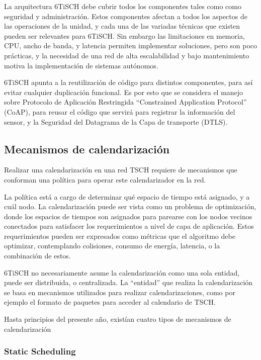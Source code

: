 La arquitectura 6TiSCH debe cubrir todos los componentes tales como como seguridad y administración. Estos componentes afectan a todos los aspectos de las operaciones de la unidad, y cada una de las variadas técnicas que existen pueden ser relevantes para 6TiSCH. Sin embargo las limitaciones en memoria, CPU, ancho de banda, y latencia permiten implementar soluciones, pero son poco prácticas, y la necesidad de una red de alta escalabilidad y bajo mantenimiento motiva la implementación de sistemas autónomos.

6TiSCH apunta a la reutilización de código para distintos componentes, para así evitar cualquier duplicación funcional. Es por esto que se considera el manejo sobre Protocolo de Aplicación Restringida ``Constrained Application Protocol'' (CoAP), para reusar el código que servirá para registrar la información del sensor, y la Seguridad del Datagrama de la Capa de transporte (DTLS).

\subsection{Mecanismos de calendarización}

Realizar una calendarización en una red TSCH requiere de mecanismos que conforman una política para operar este calendarizador en la red.

La política está a cargo de determinar qué espacio de tiempo está asignado, y a cuál nodo. La calendarización puede ser vista como un problema de optimización, donde los espacios de tiempos son asignados para parearse con los nodos vecinos conectados para satisfacer los requerimientos a nivel de capa de aplicación. Estos requerimientos pueden ser expresados como métricas que el algoritmo debe optimizar, contemplando colisiones, consumo de energía, latencia, o la combinación de estos.

6TiSCH no necesariamente asume la calendarización como una sola entidad, puede ser distribuida, o centralizada. La ``entidad'' que realiza la calendarización se basa en mecanismos utilizados para realizar calendarizaciones, como por ejemplo el formato de paquetes para acceder al calendario de TSCH.

Hasta principios del presente año, existían cuatro tipos de mecanismos de calendarización \cite{ietf-6tisch-architecture-10}

\subsubsection{Static Scheduling}

